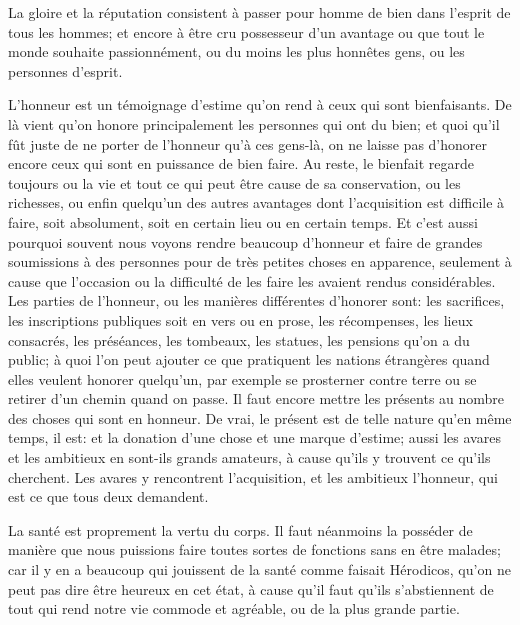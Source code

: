 \bigbreak

La gloire et la réputation consistent à passer pour homme de bien dans l'esprit de tous les hommes; et encore à être cru possesseur
d'un avantage ou que tout le monde souhaite passionnément, ou du moins les plus honnêtes gens, ou les personnes d'esprit. 

\bigbreak

L'honneur est un témoignage d'estime qu'on rend à ceux qui sont bienfaisants. De là vient qu'on honore principalement les personnes
qui ont du bien; et quoi qu'il fût juste de ne porter de l'honneur qu'à ces gens-là, on ne laisse pas d'honorer encore ceux qui sont
en puissance de bien faire. Au reste, le bienfait regarde toujours ou la vie et tout ce qui peut être cause de sa conservation, ou les
richesses, ou enfin quelqu'un des autres avantages dont l'acquisition est difficile à faire, soit absolument, soit en certain lieu ou
en certain temps. Et c'est aussi pourquoi souvent nous voyons rendre beaucoup d'honneur et faire de grandes soumissions à des personnes
pour de très petites choses en apparence, seulement à cause que l'occasion ou la difficulté de les faire les avaient rendus considérables.
Les parties de l'honneur, ou les manières différentes d'honorer sont: les sacrifices, les inscriptions publiques soit en vers ou en prose,
les récompenses, les lieux consacrés, les préséances, les tombeaux, les statues, les pensions qu'on a du public; à quoi l'on peut ajouter
ce que pratiquent les nations étrangères quand elles veulent honorer quelqu'un, par exemple se prosterner contre terre ou se retirer d'un
chemin quand on passe. Il faut encore mettre les présents au nombre des choses qui sont en honneur. De vrai, le présent est de telle nature
qu'en même temps, il est: et la donation d'une chose et une marque d'estime; aussi les avares et les ambitieux en sont-ils grands amateurs,
à cause qu'ils y trouvent ce qu'ils cherchent. Les avares y rencontrent l'acquisition, et les ambitieux l'honneur, qui est ce que tous deux
demandent. 

\bigbreak

La santé est proprement la vertu du corps. Il faut néanmoins la posséder de manière que nous puissions faire toutes sortes
de fonctions sans en être malades; car il y en a beaucoup qui jouissent de la santé comme faisait Hérodicos, qu'on ne peut
pas dire être heureux en cet état, à cause qu'il faut qu'ils s'abstiennent de tout qui rend notre vie commode et agréable,
ou de la plus grande partie.

\bigbreak

